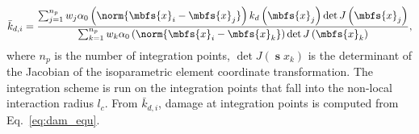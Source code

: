 \begin{equation}\label{eq:kd_fe}
\bar{k}_{d,i} = \frac{\sum_{j=1}^{n_p} w_{j} \alpha_0 \left( \norm{\mbfs{x}_i-\mbfs{x}_j} \right) k_d \left(\mbfs{x}_j\right) \det J\left(\mbfs{x}_j\right)}{\sum_{k=1}^{n_p} w_{k} \alpha_0 \left( \norm{\mbfs{x}_i-\mbfs{x}_k} \right) \det J\left(\mbfs{x}_k\right)
},
\end{equation}
where $n_p$ is the number of integration points, $\det J\left(\mbfs{x}_k\right)$ is the determinant of the Jacobian of the isoparametric element coordinate transformation. The integration scheme is run on the integration points that fall into the non-local interaction radius $l_c$. From $\bar{k}_{d,i}$, damage at integration points is computed from Eq.~\eqref{eq:dam_equ}.